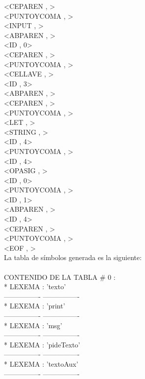 \documentclass{article}
\begin{document}
\begin{flushleft}
<CEPAREN , >\\
<PUNTOYCOMA , >\\
<INPUT , >\\
<ABPAREN , >\\
<ID , 0>\\
<CEPAREN , >\\
<PUNTOYCOMA , >\\
<CELLAVE , >\\
<ID , 3>\\
<ABPAREN , >\\
<CEPAREN , >\\
<PUNTOYCOMA , >\\
<LET , >\\
<STRING , >\\
<ID , 4>\\
<PUNTOYCOMA , >\\
<ID , 4>\\
<OPASIG , >\\
<ID , 0>\\
<PUNTOYCOMA , >\\
<ID , 1>\\
<ABPAREN , >\\
<ID , 4>\\
<CEPAREN , >\\
<PUNTOYCOMA , >\\
<EOF , >\\
La tabla de símbolos generada es la siguiente:\\
\quad\\
CONTENIDO DE LA TABLA \# 0 :\\

*	LEXEMA : 'texto'\\
---------------- ----------------\\

*	LEXEMA : 'print'\\
---------------- ----------------\\

*	LEXEMA : 'msg'\\
---------------- ----------------\\

*	LEXEMA : 'pideTexto'\\
---------------- ----------------\\

*	LEXEMA : 'textoAux'\\
---------------- ----------------\\
\end{flushleft}
\clearpage
\end{document}
